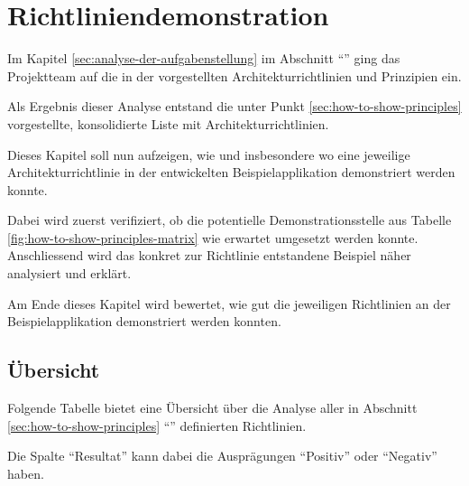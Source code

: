 \chapter{Richtliniendemonstration}

Im Kapitel \ref{sec:analyse-der-aufgabenstellung} im Abschnitt ``'' ging das Projektteam auf die in der  vorgestellten Architekturrichtlinien und Prinzipien ein.

Als Ergebnis dieser Analyse entstand die unter Punkt \ref{sec:how-to-show-principles} vorgestellte, konsolidierte Liste mit Architekturrichtlinien.

Dieses Kapitel soll nun aufzeigen, wie und insbesondere wo eine jeweilige Architekturrichtlinie in der entwickelten Beispielapplikation demonstriert werden konnte.

Dabei wird zuerst verifiziert, ob die potentielle Demonstrationsstelle aus Tabelle \ref{fig:how-to-show-principles-matrix} wie erwartet umgesetzt werden konnte.
Anschliessend wird das konkret zur Richtlinie entstandene Beispiel näher analysiert und erklärt.

Am Ende dieses Kapitel wird bewertet, wie gut die jeweiligen Richtlinien an der Beispielapplikation demonstriert werden konnten.

\newpage
\section{Übersicht}

Folgende Tabelle bietet eine Übersicht über die Analyse aller in Abschnitt \ref{sec:how-to-show-principles} ``'' definierten Richtlinien.

Die Spalte ``Resultat'' kann dabei die Ausprägungen ``Positiv'' oder ``Negativ'' haben.

